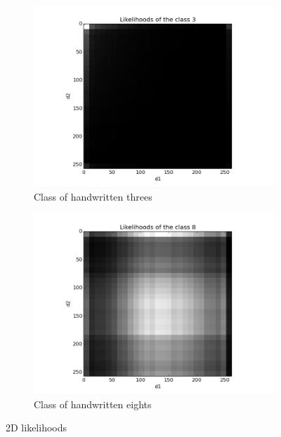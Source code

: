 \documentclass{article}
\begin{document}
\begin{figure}[ht]
        \centering
        \begin{subfigure}[b]{0.5\textwidth}
                \includegraphics[width=\textwidth]{../likelihoods3.png}
                \caption{Class of handwritten threes}
        \end{subfigure}%
        \begin{subfigure}[b]{0.5\textwidth}
                \includegraphics[width=\textwidth]{../likelihoods8.png}
                \caption{Class of handwritten eights}
        \end{subfigure}
        \caption{2D likelihoods}
        \label{img2}
\end{figure}
\end{document}
